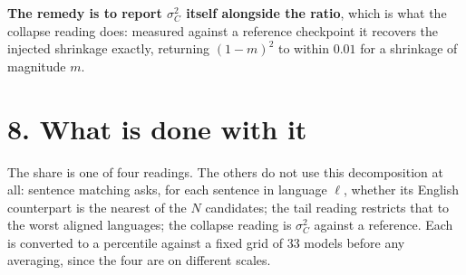 \documentclass[11pt]{article}
\newcommand{\Hi}[1]{{\color[HTML]{2B6CB0}\textbf{#1}}}
\begin{document}
\Hi{The remedy is to report $\sigma^2_C$ itself alongside the ratio},
which is what the collapse reading does: measured against a reference
checkpoint it recovers the injected shrinkage exactly, returning
$(1-m)^2$ to within $0.01$ for a shrinkage of magnitude $m$.

\section*{8. What is done with it}
The share is one of four readings. The others do not use this
decomposition at all: sentence matching asks, for each sentence in
language $\ell$, whether its English counterpart is the nearest of the
$N$ candidates; the tail reading restricts that to the worst aligned
languages; the collapse reading is $\sigma^2_C$ against a reference.
Each is converted to a percentile against a fixed grid of 33 models
before any averaging, since the four are on different scales.
\end{document}
